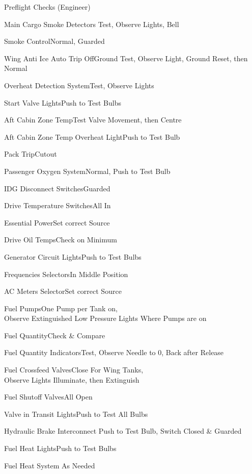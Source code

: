 \documentclass[sim-use]{checklist}
\begin{document}
\begin{checklist}{Preflight Checks (Engineer)}
    \item{Main Cargo Smoke Detectors} {Test, Observe Lights, Bell}
    \item{Smoke Control}{Normal, Guarded}
    \item{Wing Anti Ice Auto Trip Off}{Ground Test, Observe Light, Ground Reset, then Normal}
    \item{Overheat Detection System}{Test, Observe Lights}
    \item{Start Valve Lights}{Push to Test Bulbs}
    \item{Aft Cabin Zone Temp}{Test Valve Movement, then Centre}
    \item{Aft Cabin Zone Temp Overheat Light}{Push to Test Bulb}
    \item{Pack Trip}{Cutout}
    \item{Passenger Oxygen System}{Normal, Push to Test Bulb}
     {
        \item{IDG Disconnect Switches}{Guarded}
        \item {Drive Temperature Switches}{All In}
        \item{Essential Power}{Set correct Source}
        \item{Drive Oil Temps}{Check on Minimum}
        \item{Generator Circuit Lights}{Push to Test Bulbs}
        \item{Frequencies Selectors}{In Middle Position}
        \item{AC Meters Selector}{Set correct Source}
    }
     {
        \item{Fuel Pumps}{One Pump per Tank on,\\Observe Extinguished Low Pressure Lights Where Pumps are on}
        \item{Fuel Quantity}{Check \& Compare}
        \item{Fuel Quantity Indicators}{Test, Observe Needle to 0, Back after Release}
        \item{Fuel Crossfeed Valves}{Close For Wing Tanks,\\Observe Lights Illuminate, then Extinguish}
        \item{Fuel Shutoff Valves}{All Open}
        \item{Valve in Transit Lights}{Push to Test All Bulbs}
    }
    \item{Hydraulic Brake Interconnect} {Push to Test Bulb, Switch Closed \& Guarded}
    \item{Fuel Heat Lights}{Push to Test Bulbs}
    \item{Fuel Heat System} {As Needed}
\end{checklist}
\end{document}
